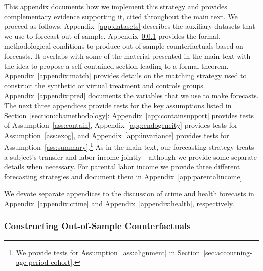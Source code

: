 \noindent This appendix documents how we implement this strategy and provides complementary evidence supporting it, cited throughout the main text. We proceed as follows. Appendix~\ref{app:datasets} describes the auxiliary datasets that we use to forecast out of sample. Appendix~\ref{appendix:just} provides the formal, methodological conditions to produce out-of-sample counterfactuals based on forecasts. It overlaps with some of the material presented in the main text with the idea to propose a self-contained section leading to a formal theorem. Appendix~\ref{appendix:match} provides details on the matching strategy used to construct the synthetic or virtual treatment and controls groups. Appendix~\ref{appendix:pred} documents the variables that we use to make forecasts. The next three appendices provide tests for the key assumptions listed in Section~\ref{section:cbamethodology}: Appendix~\ref{app:containsupport} provides tests of Assumption~\ref{ass:contain}, Appendix~\ref{app:endogeneity} provides tests for Assumption~\ref{ass:exog}, and Appendix~\ref{app:invariance} provides tests for Assumption~\ref{ass:summary}.\footnote{We provide tests for Assumption~\ref{ass:alignment} in Section~\ref{sec:accoutning-age-period-cohort}.} As in the main text, our forecasting strategy treats a subject's transfer and labor income jointly---although we provide some separate details when necessary. For parental labor income we provide three different forecasting strategies and document them in Appendix~\ref{app:parentalincome}.

\noindent We devote separate appendices to the discussion of crime and health forecasts in Appendix~\ref{appendix:crime} and Appendix~\ref{appendix:health}, respectively.

\subsubsection{Constructing Out-of-Sample Counterfactuals}\label{appendix:just}

